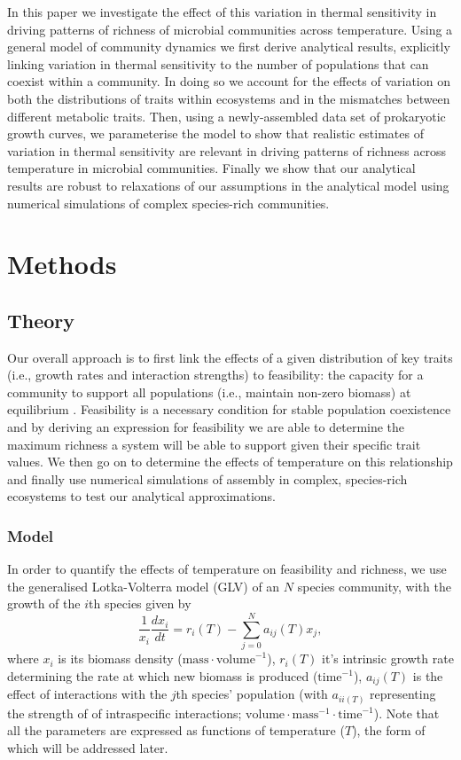 \documentclass{article}
\begin{document}
In this paper we investigate the effect of this variation in thermal sensitivity in driving patterns of richness of microbial communities across temperature. Using a general model of community dynamics we first derive analytical results, explicitly linking variation in thermal sensitivity to the number of populations that can coexist within a community. In doing so we account for the effects of variation on both the distributions of traits within ecosystems and in the mismatches between different metabolic traits. Then, using a newly-assembled data set of prokaryotic growth curves, we parameterise the model to show that realistic estimates of variation in thermal sensitivity are relevant in driving patterns of richness across temperature in microbial communities. Finally we show that our analytical results are robust to relaxations of our assumptions in the analytical model using numerical simulations of complex species-rich communities. 

\section*{Methods}

\subsection*{Theory}

Our overall approach is to first link the effects of a given distribution of key traits (i.e., growth rates and interaction strengths) to feasibility: the capacity for a community to support all populations (i.e., maintain non-zero biomass) at equilibrium  \citep{Grilli2017,Dougoud2018}. Feasibility is a necessary condition for stable population coexistence and by deriving an expression for feasibility we are able to determine the maximum richness a system will be able to support given their specific trait values. We then go on to determine the effects of temperature on this relationship and finally use numerical simulations of assembly in complex, species-rich ecosystems to test our analytical approximations. 

\subsubsection*{Model}
In order to quantify the effects of temperature on feasibility and richness, we use the generalised Lotka-Volterra model (GLV) of an $N$ species community, with the growth of the $i$th species given by
\begin{equation} \label{EQ:GLVM}
  \frac{1}{x_i} \frac{dx_i}{dt} = r_i(T) - \sum^N_{j = 0} a_{ij}(T) x_j, 
\end{equation}
where $x_i$ is its biomass density ($\text{mass} \cdot \text{volume}^{-1}$), $r_i(T)$ it's intrinsic growth rate determining the rate at which new biomass is produced ($\text{time}^{-1}$), $a_{ij}(T)$ is the effect of interactions with the $j$th species' population (with $a_{ii(T)}$ representing the strength of of intraspecific interactions; $\text{volume} \cdot \text{mass}^{-1} \cdot \text{time}^{-1}$). Note that all the parameters are expressed as functions of temperature ($T$), the form of which will be addressed later. 
\end{document}
